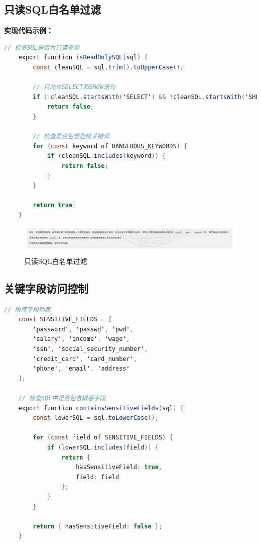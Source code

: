 \documentclass{article}
\begin{document}
	\subsection{只读SQL白名单过滤}
	
	\textbf{实现代码示例：}
	
	\begin{lstlisting}[language=java, title=SQL白名单代码示例, tabsize=4]
	// 检查SQL是否为只读查询
	export function isReadOnlySQL(sql) {
		const cleanSQL = sql.trim().toUpperCase();
		
		// 只允许SELECT和SHOW语句
		if (!cleanSQL.startsWith('SELECT') && !cleanSQL.startsWith('SHOW')) {
			return false;
		}
		
		// 检查是否包含危险关键词
		for (const keyword of DANGEROUS_KEYWORDS) {
			if (cleanSQL.includes(keyword)) {
				return false;
			}
		}
		
		return true;
	}
	\end{lstlisting}
	
	\begin{figure}[H]
		\centering
		\includegraphics[width=17cm]{./images/4.白名单.jpg}
		\caption{只读SQL白名单过滤}
	\end{figure}
	
	\subsection{关键字段访问控制}
	
	\begin{lstlisting}[language=java, title=关键字段查询控制, tabsize=4]
	// 敏感字段列表
	const SENSITIVE_FIELDS = [
		'password', 'passwd', 'pwd',
		'salary', 'income', 'wage',
		'ssn', 'social_security_number',
		'credit_card', 'card_number',
		'phone', 'email', 'address'
	];
	
	// 检查SQL中是否包含敏感字段
	export function containsSensitiveFields(sql) {
		const lowerSQL = sql.toLowerCase();
		
		for (const field of SENSITIVE_FIELDS) {
			if (lowerSQL.includes(field)) {
				return {
					hasSensitiveField: true,
					field: field
				};
			}
		}
		
		return { hasSensitiveField: false };
	}
	\end{lstlisting}
	
\end{document}
